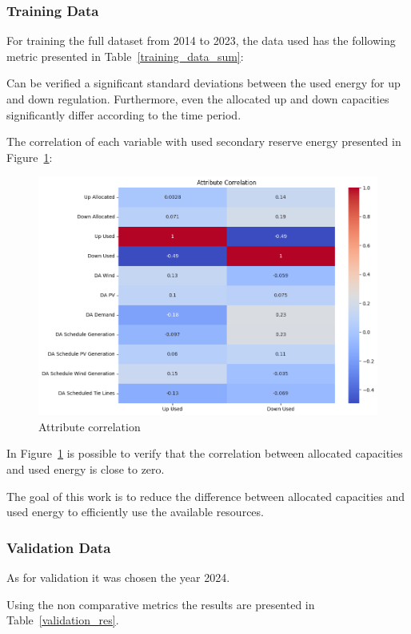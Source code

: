 \subsubsection{Training Data}
For training the full dataset from 2014 to 2023, the data used has the following metric presented in Table~\ref{training_data_sum}:



Can be verified a significant standard deviations between the used energy for up and down regulation. Furthermore, even the allocated up and down capacities significantly differ according to the time period. 

The correlation of each variable with used secondary reserve energy presented in Figure~\ref{fig:Attribute_correlation}:

\begin{figure}[H]
    \centering
    \includegraphics[width=\textwidth]{plots/correlation_heatmap.png}
    \caption{Attribute correlation}
    \label{fig:Attribute_correlation}
  \end{figure}
  
 In Figure~\ref{fig:Attribute_correlation} is possible to verify that the correlation between allocated capacities and used energy is close to zero.  
  
The goal of this work is to reduce the difference between allocated capacities and used energy to efficiently use the available resources.

\subsubsection{Validation Data}
As for validation it was chosen the year 2024.\par
Using the non comparative metrics the results are presented in Table~\ref{validation_res}.

